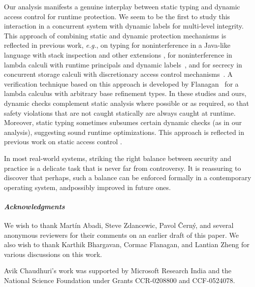 \documentclass{sigplanconf}
\begin{document}
Our analysis manifests a genuine interplay between static typing and dynamic access control for runtime protection. We seem to be the first to study this interaction in a concurrent system with dynamic labels for multi-level integrity. This approach of combining static and dynamic protection mechanisms is reflected in previous work, \emph{e.g.}, on typing for noninterference in a Java-like language with stack inspection and other extensions \cite{banerjee03using,pistoia}, for noninterference in lambda calculi with runtime principals and dynamic labels~\cite{runtimeprin,dynseclab}, and for secrecy in concurrent storage calculi with discretionary access control mechanisms~\cite{sectypfac,ChaudhuriConcur06}. A verification technique based on this approach is developed by Flanagan~\cite{hybtc} for a lambda calculus with arbitrary base refinement types. In these studies and ours, dynamic checks complement static analysis where possible or as required, so that safety violations that are not caught statically are always caught at runtime. Moreover, static typing sometimes subsumes certain dynamic checks (as in our analysis), suggesting sound runtime optimizations. This approach is reflected in previous work on static access control \cite{inflowresacc,pottier-skalka-smith-toplas05,sumii}. 

In most real-world systems, striking the right balance between security and practice is a delicate task that is never far from controversy. It is reassuring to discover that perhaps, such a balance can be enforced formally in a contemporary operating system, and\linebreak possibly improved in future ones.

\paragraph{\em Acknowledgments}
We wish to thank Mart\'in Abadi, Steve Zdan\-cewic, Pavol \v{C}ern\'y,  and several anonymous reviewers for their comments on an earlier draft of this paper. We also wish to thank 
Karthik Bhargavan, Cormac Flanagan, and Lantian Zheng for various discussions on this work. 

Avik Chaudhuri's work was supported by Microsoft Research India and the National Science
Foundation under Grants CCR-0208800 and CCF-0524078.







\appendix
\end{document}
